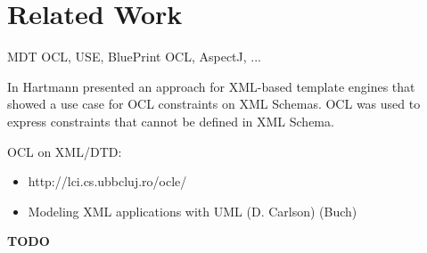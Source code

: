 \section{Related Work}
MDT OCL, USE, BluePrint OCL, AspectJ, ...

In \cite{hartmannDEXA06,hartmannICWI07} Hartmann presented an approach for XML-based template engines that showed a use case for OCL constraints on XML Schemas. OCL was used to express constraints that cannot be defined in XML Schema.

OCL on XML/DTD:
\begin{itemize}
	\item http://lci.cs.ubbcluj.ro/ocle/
	\item Modeling XML applications with UML (D. Carlson) (Buch)
\end{itemize}

\textbf{TODO}